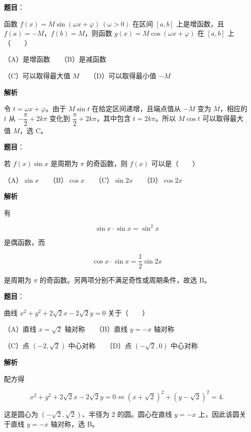 \begin{answer}

\textbf{题目}：

函数 $f(x)=M\sin(\omega x+\varphi)\ (\omega>0)$ 在区间 $[a,b]$ 上是增函数，且 $f(a)=-M$，$f(b)=M$，则函数 $g(x)=M\cos(\omega x+\varphi)$ 在 $[a,b]$ 上\mbox{（　　）}

（A）是增函数　　（B）是减函数

（C）可以取得最大值 $M$　　（D）可以取得最小值 $-M$

\textbf{解析}

令 $t=\omega x+\varphi$。由于 $M\sin t$ 在给定区间递增，且端点值从 $-M$ 变为 $M$，相应的 $t$ 从 $-\dfrac\pi2+2k\pi$ 变化到 $\dfrac\pi2+2k\pi$，其中包含 $t=2k\pi$。所以 $M\cos t$ 可以取得最大值 $M$，选 C。


\end{answer}
\begin{answer}

\textbf{题目}：

若 $f(x)\sin x$ 是周期为 $\pi$ 的奇函数，则 $f(x)$ 可以是\mbox{（　　）}

（A）$\sin x$　　（B）$\cos x$　　（C）$\sin2x$　　（D）$\cos2x$

\textbf{解析}

有

\nopagebreak[4]
\[
\sin x\cdot\sin x=\sin^2x
\]

是偶函数，而

\nopagebreak[4]
\[
\cos x\cdot\sin x=\frac12\sin2x
\]

是周期为 $\pi$ 的奇函数。另两项分别不满足奇性或周期条件，故选 B。


\end{answer}
\begin{answer}

\textbf{题目}：

曲线 $x^2+y^2+2\sqrt2x-2\sqrt2y=0$ 关于\mbox{（　　）}

（A）直线 $x=\sqrt2$ 轴对称　　（B）直线 $y=-x$ 轴对称

（C）点 $(-2,\sqrt2)$ 中心对称　　（D）点 $(-\sqrt2,0)$ 中心对称

\textbf{解析}

配方得

\nopagebreak[4]
\[
x^2+y^2+2\sqrt2x-2\sqrt2y=0
\Longleftrightarrow
(x+\sqrt2)^2+(y-\sqrt2)^2=4.
\]

这是圆心为 $(-\sqrt2,\sqrt2)$、半径为 $2$ 的圆。圆心在直线 $y=-x$ 上，因此该圆关于直线 $y=-x$ 轴对称，选 B。


\end{answer}
